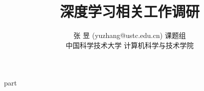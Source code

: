 \documentclass[a4paper]{ctexart}
\begin{document}
\title{深度学习相关工作调研}
\author{
\rm 张 昱 (yuzhang@ustc.edu.cn) 课题组\\
中国科学技术大学 计算机科学与技术学院
}

\maketitle
{}
\newpage
\tableofcontents
\newpage
{part}
\begin{small}


\end{small}
\end{document}
